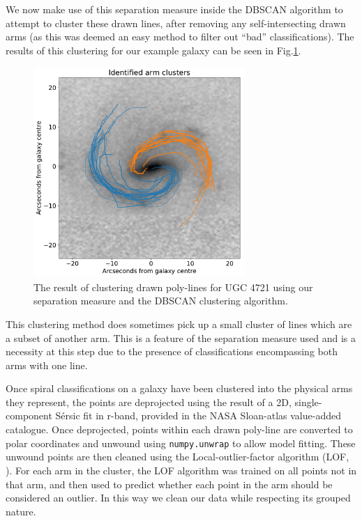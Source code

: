 \documentclass[../main.tex]{subfiles}
\begin{document}
We now make use of this separation measure inside the DBSCAN algorithm to attempt to cluster these drawn lines, after removing any self-intersecting drawn arms (as this was deemed an easy method to filter out ``bad'' classifications). The results of this clustering for our example galaxy can be seen in Fig.\ref{fig:arm_clusters}.

\begin{figure}
  \includegraphics[width=8cm]{images__results/arm_clusters.pdf}
  \caption{The result of clustering drawn poly-lines for UGC 4721 using our separation measure and the DBSCAN clustering algorithm.}
  \label{fig:arm_clusters}
\end{figure}

This clustering method does sometimes pick up a small cluster of lines which are a subset of another arm. This is a feature of the separation measure used and is a necessity at this step due to the presence of classifications encompassing both arms with one line.

Once spiral classifications on a galaxy have been clustered into the physical arms they represent, the points are deprojected using the result of a 2D, single-component S\'ersic fit in r-band, provided in the NASA Sloan-atlas value-added catalogue. Once deprojected, points within each drawn poly-line are converted to polar coordinates and unwound using \texttt{numpy.unwrap} to allow model fitting. These unwound points are then cleaned using the Local-outlier-factor algorithm (LOF, \citealt{local-outlier-factor}). For each arm in the cluster, the LOF algorithm was trained on all points not in that arm, and then used to predict whether each point in the arm should be considered an outlier. In this way we clean our data while respecting its grouped nature.
\end{document}
